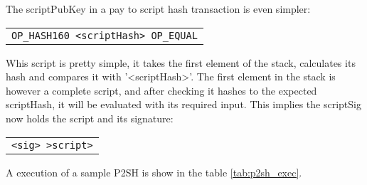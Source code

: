 The scriptPubKey in a pay to script hash transaction is even simpler:
\begin{center}
	\begin{tabular}{|c|}
		\texttt{OP\_HASH160 <scriptHash> OP\_EQUAL}
	\end{tabular}
\end{center}
Whis script is pretty simple, it takes the first element of the stack,
  calculates its hash and compares it with '<scriptHash>'. The first
  element in the stack is however a complete script, and after checking
  it hashes to the expected scriptHash, it will be evaluated with its
  required input. This implies the scriptSig now holds the script and
  its signature:

\begin{center}
	\begin{tabular}{|c|}
		\texttt{<sig> >script>}
	\end{tabular}
\end{center}


  A execution of a sample P2SH is show in the table \ref{tab:p2sh_exec}.

